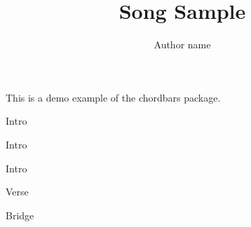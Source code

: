 \documentclass[11pt]{article}
\title{Song Sample}
\author{Author name}
\begin{document}
\maketitle

This is a demo example of the chordbars package.

\begin{chordbar}{4}{1}{Intro}
\end{chordbar}

\begin{chordbar}{4}{1}{Intro}
\end{chordbar}

\begin{chordbar}{4}{1}{Intro}
\end{chordbar}


\begin{chordbar}{8}{2}{Verse}
\end{chordbar}

\begin{chordbar}{8}{1}{Bridge}
\end{chordbar}
\end{document}
